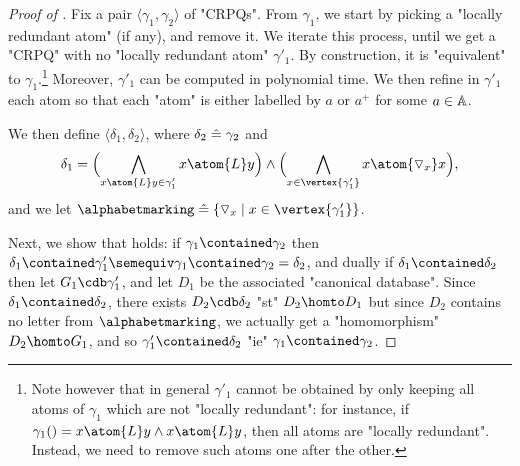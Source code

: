 \begin{proof}[Proof of ]
	Fix a pair $\langle \gamma_1, \gamma_2 \rangle$ of "CRPQs".
	From $\gamma_1$, we start by picking a "locally redundant atom" (if any), and remove it.
	We iterate this process, until we get a "CRPQ" with no "locally redundant atom" $\gamma'_1$.
	By construction, it is "equivalent" to $\gamma_1$.\footnote{Note however that in general $\gamma'_1$ cannot be
	obtained by only keeping all atoms of $\gamma_1$ which are not "locally redundant": for instance, if $\gamma_1() =
	x \atom{L} y \land x \atom{L} y$, then all atoms are "locally redundant".
	Instead, we need to remove such atoms one after the other.}
	Moreover, $\gamma'_1$ can be computed in polynomial time.
	We then refine in $\gamma'_1$ each atom so that each "atom" is either labelled by $a$ or
	$a^+$ for some $a\in \mathbb{A}$.

	We then define $\langle \delta_1, \delta_2 \rangle$, where
	$\delta_2 \mathrel{\hat{=}} \gamma_2$ and
	\[
		\delta_1 = \Bigl(
			\bigwedge_{x \atom{L} y \in \gamma'_1} x \atom{L} y
		\Bigr)
		\land 
		\Bigl(
			\bigwedge_{x \in \vertex{\gamma'_1}} x \atom{\marking_x} x
		\Bigr),
	\]
	and we let $\alphabetmarking \defeq \{\marking_x \mid x \in \vertex{\gamma'_1}\}$.

	Next, we show that \axiomCanonMonotonicity{} holds:
	if $\gamma_1 \contained \gamma_2$ then $\delta_1 \contained \gamma'_1 \semequiv \gamma_1 \contained \gamma_2 = \delta_2$,
	and dually if $\delta_1 \contained \delta_2$ then let $G_1 \cdb \gamma'_1$, and let $D_1$ be the associated "canonical database".
	Since $\delta_1 \contained \delta_2$, there exists $D_2 \cdb \delta_2$ "st" $D_2 \homto D_1$ but since $D_2$ contains no
	letter from $\alphabetmarking$, we actually get a "homomorphism" $D_2 \homto G_1$, and so $\gamma'_1 \contained \delta_2$
	"ie" $\gamma_1 \contained \gamma_2$.


\end{proof}
